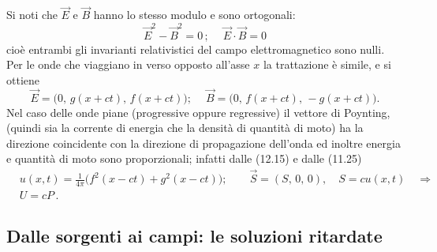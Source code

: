 Si noti che $\vec E$ e $\vec B$ hanno lo stesso modulo e sono ortogonali:
\begin{equation}
  \vec E^2-\vec B^2=0\,;\quad\ \vec E\cdot\vec B=0
  \tag{12.16}
\end{equation}
cio\`e entrambi gli invarianti relativistici del campo elettromagnetico sono
nulli.\\
Per le onde che viaggiano in verso opposto all'asse $x$ la trattazione \`e
simile, e si ottiene
\begin{equation}
  \vec E=\big(0,\,g(x+ct),\,f(x+ct)\big);
  \quad\ \vec B=\big(0,\,f(x+ct),\,-g(x+ct)\big).
  \tag{12.17}
\end{equation}
Nel caso delle onde piane (progressive oppure regressive) il vettore di
Poynting, (quindi sia la corrente di energia che la densit\`a di quantit\`a di
moto) ha la direzione coincidente con la direzione di propagazione dell'onda ed
inoltre energia e quantit\`a di moto sono proporzionali; infatti dalle (12.15) e
dalle (11.25)
\begin{equation}
  \begin{aligned}
    &u(x,t)=\frac{1}{4\pi}\big(f^2(x-ct)+g^2(x-ct)\big);
    \qquad\vec S=(S,\,0,\,0),\quad S=cu(x,t)\quad\Rightarrow\\
    &U=cP\,.
  \end{aligned}
  \tag{12.18}
\end{equation}

\subsection{Dalle sorgenti ai campi: le soluzioni ritardate}

